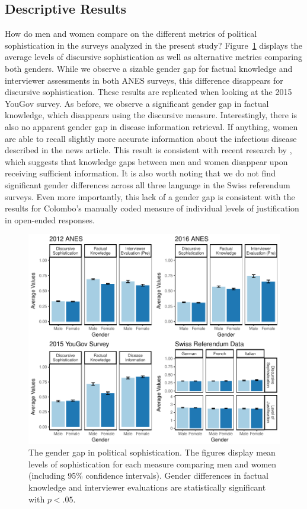 \documentclass[12pt]{article}
\begin{document}
\subsection*{Descriptive Results}

How do men and women compare on the different metrics of political sophistication in the surveys analyzed in the present study? Figure~\ref{fig:meandiff} displays the average levels of discursive sophistication as well as alternative metrics comparing both genders. While we observe a sizable gender gap for factual knowledge and interviewer assessments in both ANES surveys, this difference disappears for discursive sophistication. These results are replicated when looking at the 2015 YouGov survey. As before, we observe a significant gender gap in factual knowledge, which disappears using the discursive measure. Interestingly, there is also no apparent gender gap in disease information retrieval. If anything, women are able to recall slightly more accurate information about the infectious disease described in the news article. This result is consistent with recent research by \citet{jerit2017revisiting}, which suggests that knowledge gaps between men and women disappear upon receiving sufficient information. It is also worth noting that we do not find significant gender differences across all three language in the Swiss referendum surveys. Even more importantly, this lack of a gender gap is consistent with the results for Colombo's \citeyearpar{colombo2016justifications} manually coded measure of individual levels of justification in open-ended responses.

\begin{figure}[h]\centering
\includegraphics{../fig/meandiff.pdf}
\caption{The gender gap in political sophistication. The figures display mean levels of sophistication for each measure comparing men and women (including 95\% confidence intervals). Gender differences in factual knowledge and interviewer evaluations are statistically significant with $p<.05$.}\label{fig:meandiff}
\end{figure}
\end{document}
